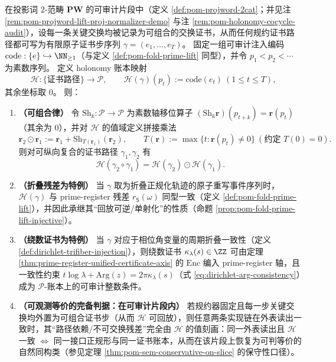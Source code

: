 \begin{theorem}\label{thm:holonomy-register-isomorphism}
在投影词 \(2\)-范畴 \(\mathbf{PW}\) 的可审计片段中（定义 \ref{def:pom-projword-2cat}；并见注 \ref{rem:pom-projword-lift-proj-normalizer-demo} 与注 \ref{rem:pom-holonomy-cocycle-audit}），设每一条关键交换均被记录为可组合的交换证书，从而任何规约证书路径都可写为有限原子证书步序列 \(\gamma=(e_1,\dots,e_T)\)。
固定一组可审计注入编码 \(\mathrm{code}:\{e\}\hookrightarrow\NN_{\ge 1}\)（与定义 \ref{def:pom-fold-prime-lift} 同型），并令 \(p_1<p_2<\cdots\) 为素数序列。
定义 holonomy 账本映射
\[
\mathcal{H}:\{\text{证书路径}\}\longrightarrow \mathcal{P},
\qquad
\mathcal{H}(\gamma)(p_t):=\mathrm{code}(e_t)\ (1\le t\le T),
\]
其余坐标取 \(0\)。
则：
\begin{enumerate}
  \item \textbf{（可组合律）} 令 \(\mathrm{Sh}_k:\mathcal{P}\to\mathcal{P}\) 为素数轴移位算子 \((\mathrm{Sh}_k\mathbf r)(p_{t+k})=\mathbf r(p_t)\)（其余为 \(0\)），并对 \(\mathcal{H}\) 的值域定义拼接乘法
  \[
  \mathbf r_2\odot \mathbf r_1:=\mathbf r_1+\mathrm{Sh}_{T(\mathbf r_1)}(\mathbf r_2),
  \qquad
  T(\mathbf r):=\max\{t:\mathbf r(p_t)\neq 0\}\ (\text{约定 }T(0)=0).
  \]
  则对可纵向复合的证书路径 \(\gamma_1,\gamma_2\) 有
  \[
  \mathcal{H}(\gamma_2\circ\gamma_1)=\mathcal{H}(\gamma_2)\odot \mathcal{H}(\gamma_1).
  \]
  \item \textbf{（折叠残差为特例）} 当 \(\gamma\) 取为折叠正规化轨迹的原子重写事件序列时，\(\mathcal{H}(\gamma)\) 与 prime-register 残差 \(r_{\mathsf S}(\omega)\) 同型一致（定义 \ref{def:pom-fold-prime-lift}），并因此承继其“回放可逆/单射化”的性质（命题 \ref{prop:pom-fold-prime-lift-injective}）。
  \item \textbf{（绕数证书为特例）} 当 \(\gamma\) 对应于相位角变量的周期折叠一致性（定义 \ref{def:dirichlet-trifiber-injection}），则绕数证书 \(\kappa_\lambda(s)\in\ZZ\) 可由定理 \ref{thm:prime-register-unified-certificate-axis} 的 \(\mathrm{Enc}\) 编入 prime-register 轴，且一致性约束 \(t\log\lambda+\mathrm{Arg}(z)=2\pi\kappa_\lambda(s)\)（式 \eqref{eq:dirichlet-arg-consistency}）成为 \(\mathcal{P}\)-账本上的可审计整数条件。
  \item \textbf{（可观测等价的完备判据：在可审计片段内）} 若规约器固定且每一步关键交换均外置为可组合证书步（从而 \(\mathcal{H}\) 可回放），则任意两条实现链在外表读出一致时，其“路径依赖/不可交换残差”完全由 \(\mathcal{H}\) 的值刻画：同一外表读出且 \(\mathcal{H}\) 一致 \(\Longleftrightarrow\) 同一接口正规形与同一证书账本，从而在该片段上恢复为可判等价的自然同构类（参见定理 \ref{thm:pom-sem-conservative-on-slice} 的保守性口径）。
\end{enumerate}
\end{theorem}

